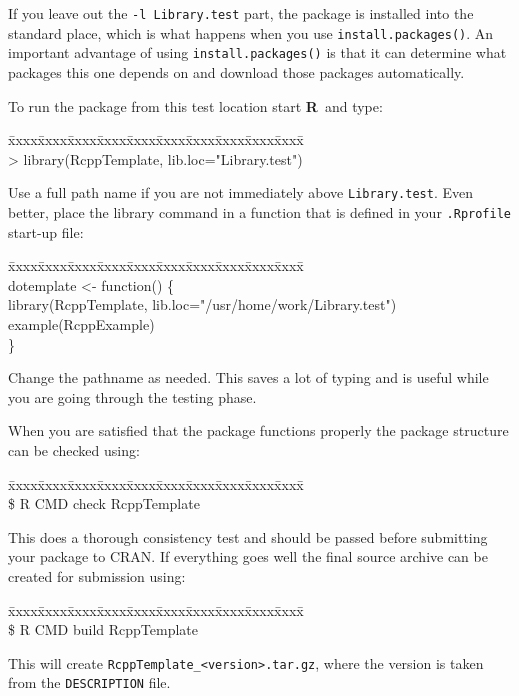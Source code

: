 \documentclass{article}
\newenvironment{program}{\ttfamily\begin{tabbing}
\=xxxx\=xxxx\=xxxx\=xxxx\=xxxx\=xxxx\=xxxx\=xxxx\=xxxx\=xxxx\= \+ \kill \\
}{\end{tabbing}}
\newcommand{\R}{{\bf R}}
\begin{document}
If you leave out the {\tt -l Library.test} part, the package is installed
into the standard place, which is what happens when you use
{\tt install.packages()}. An important advantage of using 
{\tt install.packages()} is that it can determine what
packages this one depends on and download those packages automatically.

To run the package from this test location start \R\ and type:
\begin{program}
> library(RcppTemplate, lib.loc="Library.test")
\end{program}
Use a full path name if you are not immediately above {\tt Library.test}.
Even better, place the library command in a function that is
defined in your {\tt .Rprofile} start-up file:
\begin{program}
  dotemplate <- function() \{\\
    \> library(RcppTemplate, lib.loc="/usr/home/work/Library.test")\\
    \> example(RcppExample)\\
    \}\\
\end{program}
Change the pathname as needed.
This saves a lot of typing and is useful while you are going through
the testing phase.

When you are satisfied that the package functions properly the
package structure can be checked using:
\begin{program}
\$ R CMD check RcppTemplate
\end{program}
This does a thorough consistency test and should be passed before
submitting your package to CRAN. If everything goes well the final
source archive can be created for submission using:
\begin{program}
\$ R CMD build RcppTemplate
\end{program}
This will create {\tt RcppTemplate\_<version>.tar.gz}, where the
version is taken from the {\tt DESCRIPTION} file.
\end{document}
